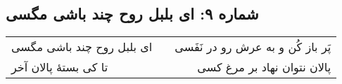 \begin{center}
\section*{شماره ۹: ای بلبل روح چند باشی مگسی}
\label{sec:009}
\begin{longtable}{l p{0.5cm} r}
ای بلبل روح چند باشی مگسی
&&
پَر باز کُن و به عرش رو در نَفَسی
\\
تا کی بستهٔ پالان آخر
&&
پالان نتوان نهاد بر مرغ کسی
\\
\end{longtable}
\end{center}
